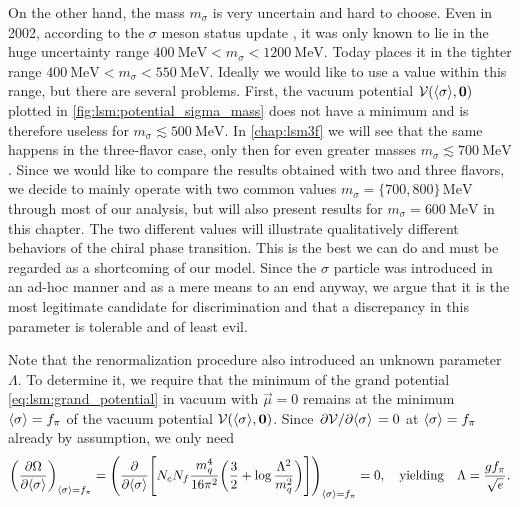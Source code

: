 On the other hand, the mass $m_\sigma$ is very uncertain and hard to choose.
Even in 2002, according to the $\sigma$ meson status update \cite{ref:sigma_meson_status},
it was only known to lie in the huge uncertainty range $\SI{400}{\mega\electronvolt} < m_\sigma < \SI{1200}{\mega\electronvolt}$.
Today \cite{ref:pdg_review_2021} places it in the tighter range $\SI{400}{\mega\electronvolt} < m_\sigma < \SI{550}{\mega\electronvolt}$.
Ideally we would like to use a value within this range, but there are several problems.
First, the vacuum potential $\mathcal{V}(\langle \sigma \rangle,{\bm{0}})$ plotted in \cref{fig:lsm:potential_sigma_mass} does not have a minimum and is therefore useless for $m_\sigma \lesssim \SI{500}{\mega\electronvolt}$.
In \cref{chap:lsm3f} we will see that the same happens in the three-flavor case, only then for even greater masses $m_\sigma \lesssim \SI{700}{\mega\electronvolt}$.
Since we would like to compare the results obtained with two and three flavors,
we decide to mainly operate with two common values $m_\sigma = \{700,800\} \, \si{\mega\electronvolt}$ through most of our analysis,
but will also present results for $m_\sigma = \SI{600}{\mega\electronvolt}$ in this chapter.
The two different values will illustrate qualitatively different behaviors of the chiral phase transition.
This is the best we can do and must be regarded as a shortcoming of our model.
Since the $\sigma$ particle was introduced in an ad-hoc manner and as a mere means to an end anyway,
we argue that it is the most legitimate candidate for discrimination
and that a discrepancy in this parameter is tolerable and of least evil.

Note that the renormalization procedure also introduced an unknown parameter $\Lambda$.
To determine it, we require that the minimum of the grand potential \eqref{eq:lsm:grand_potential} in vacuum with $\vec{\mu}=0$
remains at the minimum $\langle \sigma \rangle = f_\pi$ of the vacuum potential $\mathcal{V}(\langle \sigma \rangle,{\bm{0}})$.
Since $\pdv{\mathcal{V}}/{\langle \sigma \rangle} = 0$ at $\langle \sigma \rangle=f_\pi$ already by assumption, we only need
\begin{equation}
	\pdv{\Omega}{ \langle \sigma \rangle}_{\langle \sigma \rangle=f_\pi} =
	\pdv*{\Bigg[ N_c N_f \frac{m_q^4}{16 \pi^2} \bigg( \frac32 + \log \frac{\Lambda^2}{m_q^2} \bigg) \Bigg] }{\langle \sigma \rangle}_{\langle \sigma \rangle=f_\pi} = 0,
	\quad \text{yielding} \quad
	\Lambda = \frac{g f_\pi}{\sqrt{e}}.
\label{eq:lsm:potential_vacuum_minimum}
\end{equation}

